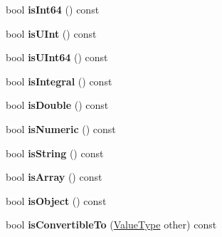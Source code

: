 \begin{DoxyCompactItemize}
\item 
bool {\bfseries is\+Int64} () const \hypertarget{classJson_1_1Value_aba89690e5fd72d0f7121a30013470423}{}\label{classJson_1_1Value_aba89690e5fd72d0f7121a30013470423}

\item 
bool {\bfseries is\+U\+Int} () const \hypertarget{classJson_1_1Value_ae814ca1796fe2d43ac09898b70213989}{}\label{classJson_1_1Value_ae814ca1796fe2d43ac09898b70213989}

\item 
bool {\bfseries is\+U\+Int64} () const \hypertarget{classJson_1_1Value_aa35efece2a6cba4d988d7d5b54db2fb8}{}\label{classJson_1_1Value_aa35efece2a6cba4d988d7d5b54db2fb8}

\item 
bool {\bfseries is\+Integral} () const \hypertarget{classJson_1_1Value_aec4f74ef7b776b1d9c8a10fc3bb4add5}{}\label{classJson_1_1Value_aec4f74ef7b776b1d9c8a10fc3bb4add5}

\item 
bool {\bfseries is\+Double} () const \hypertarget{classJson_1_1Value_a0ea567fa51fc808851698bef59b43626}{}\label{classJson_1_1Value_a0ea567fa51fc808851698bef59b43626}

\item 
bool {\bfseries is\+Numeric} () const \hypertarget{classJson_1_1Value_a8ce848900e2e8fa23a41fcc2c1409fab}{}\label{classJson_1_1Value_a8ce848900e2e8fa23a41fcc2c1409fab}

\item 
bool {\bfseries is\+String} () const \hypertarget{classJson_1_1Value_a06c01d7c1e8151a5844b595ab00f46c7}{}\label{classJson_1_1Value_a06c01d7c1e8151a5844b595ab00f46c7}

\item 
bool {\bfseries is\+Array} () const \hypertarget{classJson_1_1Value_ac8c898f93543e55b67418f94bced20af}{}\label{classJson_1_1Value_ac8c898f93543e55b67418f94bced20af}

\item 
bool {\bfseries is\+Object} () const \hypertarget{classJson_1_1Value_a80cffaa0402b80317c0437216bbb6d92}{}\label{classJson_1_1Value_a80cffaa0402b80317c0437216bbb6d92}

\item 
bool {\bfseries is\+Convertible\+To} (\hyperlink{namespaceJson_a7d654b75c16a57007925868e38212b4e}{Value\+Type} other) const \hypertarget{classJson_1_1Value_a7ec153803631a27abf58cba2bb1af70c}{}\label{classJson_1_1Value_a7ec153803631a27abf58cba2bb1af70c}


\end{DoxyCompactItemize}
